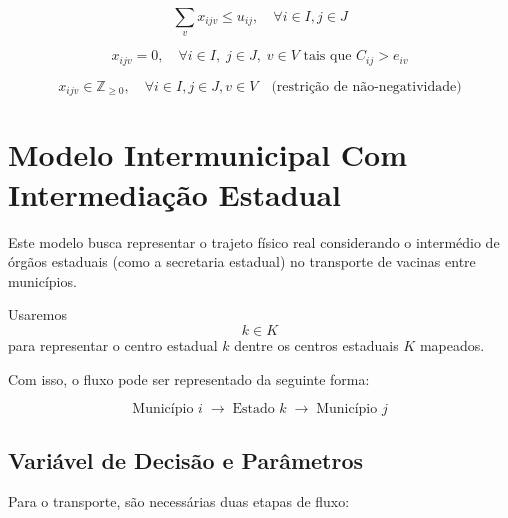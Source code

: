 \begin{equation*}
    \sum_{v} x_{ijv} \le u_{ij}, \quad \forall i \in I, j \in J
\end{equation*}

\begin{equation*}
x_{ijv} = 0, \quad \forall i \in I, \; j \in J, \; v \in V \text{ tais que } C_{ij} > e_{iv}
\end{equation*}

\begin{equation*}
    x_{ijv} \in \mathbb{Z}_{\geq 0}, \quad \forall i \in I, j \in J, v \in V \quad \text{(restrição de não-negatividade)}
\end{equation*}


\section{Modelo Intermunicipal Com Intermediação Estadual}

Este modelo busca representar o trajeto físico real considerando o intermédio de órgãos estaduais (como a secretaria estadual) no transporte de vacinas entre municípios.

Usaremos
\[ k \in K \]
para representar o centro estadual $k$ dentre os centros estaduais $K$ mapeados.

Com isso, o fluxo pode ser representado da seguinte forma:

\[
\text{Município } i \;\longrightarrow\; \text{Estado } k \;\longrightarrow\; \text{Município } j
\]

\subsection{Variável de Decisão e Parâmetros}

Para o transporte, são necessárias duas etapas de fluxo:

